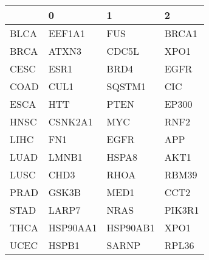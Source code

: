\begin{tabular}{llll}
\toprule
{} &         0 &         1 &       2 \\
\midrule
BLCA &    EEF1A1 &       FUS &   BRCA1 \\
BRCA &     ATXN3 &     CDC5L &    XPO1 \\
CESC &      ESR1 &      BRD4 &    EGFR \\
COAD &      CUL1 &    SQSTM1 &     CIC \\
ESCA &       HTT &      PTEN &   EP300 \\
HNSC &   CSNK2A1 &       MYC &    RNF2 \\
LIHC &       FN1 &      EGFR &     APP \\
LUAD &     LMNB1 &     HSPA8 &    AKT1 \\
LUSC &      CHD3 &      RHOA &   RBM39 \\
PRAD &     GSK3B &      MED1 &    CCT2 \\
STAD &     LARP7 &      NRAS &  PIK3R1 \\
THCA &  HSP90AA1 &  HSP90AB1 &    XPO1 \\
UCEC &     HSPB1 &     SARNP &   RPL36 \\
\bottomrule
\end{tabular}
